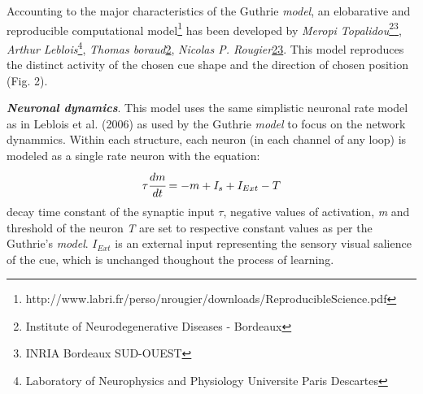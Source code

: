 \documentclass[11pt]{article}
\begin{document}
Accounting to the major characteristics of the Guthrie \emph{model}, an elobarative and reproducible computational model\footnote{http://www.labri.fr/perso/nrougier/downloads/ReproducibleScience.pdf} has been developed by \emph{Meropi Topalidou}\footnote{\label{imn}Institute of Neurodegenerative Diseases - Bordeaux}\footnote{\label{inria}INRIA Bordeaux SUD-OUEST}, \emph{Arthur Leblois}\footnote{Laboratory of Neurophysics and Physiology Universite Paris Descartes}, \emph{Thomas boraud}\cref{imn}, \emph{Nicolas P. Rougier}\cref{imn}\cref{inria}. This model reproduces the distinct activity of the chosen cue shape and the direction of chosen position (Fig. 2).\par

\textbf{\emph{Neuronal dynamics}}. This model uses the same simplistic neuronal rate model as in Leblois et al. (2006) as used by the Guthrie \emph{model} to focus on the network dynammics. Within each structure, each neuron (in each channel of any loop) is modeled as a single rate neuron with the equation:
\begin{equation}
\tau \cfrac{dm}{dt} = -m + I_s + I_{Ext} - T
\end{equation}
decay time constant of the synaptic input $\tau$, negative values of activation, \emph{m} and threshold of the neuron \emph{T} are set to respective constant values as per the Guthrie's \emph{model}. $I_{Ext}$ is an external input representing the sensory visual salience of the cue, which is unchanged thoughout the process of learning.
\end{document}

